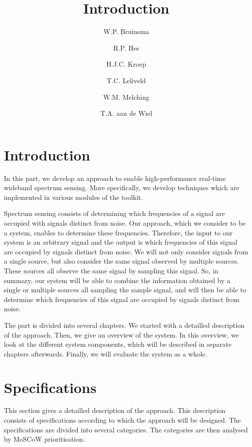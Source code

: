 \documentclass[a4paper, openany, oneside]{memoir}
\title{Introduction}
\author{W.P. Bruinsma \and R.P. Hes \and H.J.C. Kroep \and T.C. Leliveld \and W.M. Melching \and T.A. aan de Wiel}
\begin{document}
\section{Introduction}
In this part, we develop an approach to enable high-performance real-time wideband spectrum sensing. More specifically, we develop techniques which are implemented in various modules of the toolkit.

Spectrum sensing consists of determining which frequencies of a signal are occupied with signals distinct from noise. Our approach, which we consider to be a system, enables to determine these frequencies. Therefore, the input to our system is an arbitrary signal and the output is which frequencies of this signal are occupied by signals distinct from noise. We will not only consider signals from a single source, but also consider the same signal observed by multiple sources. These sources all observe the same signal by sampling this signal. So, in summary, our system will be able to combine the information obtained by a single or multiple sources all sampling the sample signal, and will then be able to determine which frequencies of this signal are occupied by signals distinct from noise. 

The part is divided into several chapters. We started with a detailled description of the approach. Then, we give an overview of the system. In this overview, we look at the different system components, which will be described in separate chapters afterwards. Finally, we will evaluate the system as a whole.

\section{Specifications}
\label{sec:theory-specs}
This section gives a detailled description of the approach. This description consists of specifications according to which the approach will be designed. The specifications are divided into several categories. The categories are then analysed by MoSCoW prioritisation.
\end{document}
